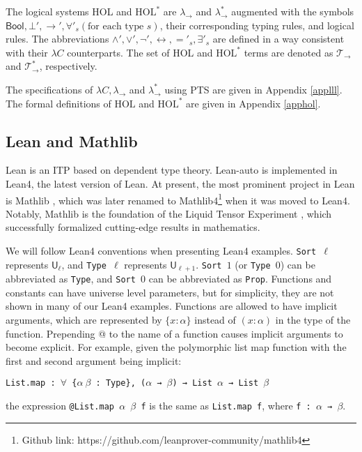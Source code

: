   The logical systems HOL and $\text{HOL}^*$ are $\lambda_\to$ and $\lambda_\to^*$ augmented
  with the symbols $\mathsf{Bool}, \bot', \to', \forall'_s(\text{for each type }s)$, their
  corresponding typing rules, and logical rules. The abbreviations $\land', \lor', \neg', \leftrightarrow, ='_s, \exists'_s$
  are defined in a way consistent with their $\lambda C$ counterparts.
  The set of HOL and $\text{HOL}^*$ terms are denoted as $\mathcal{T}_\to$ and $\mathcal{T}_\to^*$, respectively.

  The specifications of $\lambda C, \lambda_\to$ and $\lambda_\to^*$ using PTS are given in Appendix \ref{applll}.
  The formal definitions of $\text{HOL}$ and $\text{HOL}^*$ are given in Appendix \ref{apphol}.

\subsection{Lean and Mathlib}\label{sectlean}

  Lean is an ITP based on dependent type theory. Lean-auto
  is implemented in Lean4, the latest version of Lean. At present, the
  most prominent project in Lean is Mathlib \cite{MathlibPaper},
  which was later renamed to Mathlib4\footnote{Github link: https://github.com/leanprover-community/mathlib4}
  when it was moved to Lean4. Notably, Mathlib is the foundation of the
  Liquid Tensor Experiment \cite{LiquidTensor}, which successfully
  formalized cutting-edge results in mathematics. 

  We will follow Lean4 conventions when presenting Lean4 examples. \texttt{Sort $\ell$}
  represents $\mathsf{U}_\ell$, and \texttt{Type $\ell$} represents $\mathsf{U}_{\ell + 1}$.
  \texttt{Sort $1$} (or \texttt{Type $0$}) can be abbreviated as \texttt{Type},
  and \texttt{Sort $0$} can be abbreviated as \texttt{Prop}.
  Functions and constants can have universe level parameters, but for simplicity,
  they are not shown in many of our Lean4 examples. 
  Functions are allowed to have implicit arguments, which are represented by
  $\{x : \alpha\}$ instead of $(x : \alpha)$ in the type of the function.
  Prepending \textrm{@} to the name of a function causes implicit arguments
  to become explicit. For example, given the polymorphic list map function
  with the first and second argument being implicit:

  \centerline{\texttt{List.map : $\forall$ \{$\alpha \ \beta$ : Type\}, ($\alpha$ → $\beta$) → List $\alpha$ → List $\beta$}}
  
  \noindent the expression \texttt{@List.map $\alpha$ $\beta$ f} is the same as \texttt{List.map f}, where \texttt{f : $\alpha$ → $\beta$}.

